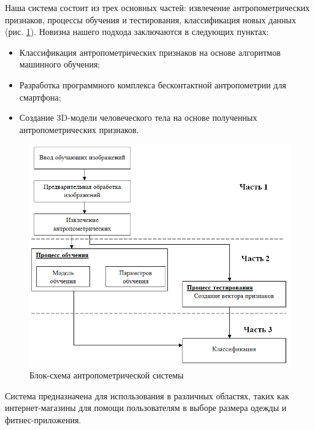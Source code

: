 Наша система состоит из трех основных частей: извлечение антропометрических признаков, процессы обучения и тестирования, классификация новых данных (рис. \ref{img7}). Новизна нашего подхода заключаются в следующих пунктах:

\begin{itemize}
	\item Классификация антропометрических признаков на основе алгоритмов машинного обучения;
	\item Разработка программного комплекса бесконтактной антропометрии для смартфона;
	\item Создание 3D-модели человеческого тела на основе полученных антропометрических признаков.
\end{itemize}
\begin{figure}[ht!]
\centering
\includegraphics [scale=0.8] {images/h7.png}
\begin{center}
\caption{Блок-схема антропометрической системы} \label{img7}
\end{center}
\end{figure}
Система предназначена для использования в различных областях, таких как интернет-магазины для помощи пользователям в выборе размера одежды и фитнес-приложения.
